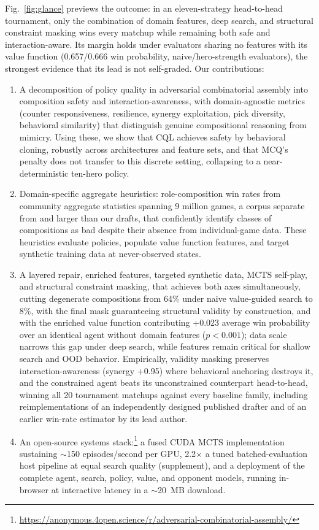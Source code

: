 \documentclass[journal]{IEEEtran}
\newcommand{\repourl}{\url{https://anonymous.4open.science/r/adversarial-combinatorial-assembly/}}
\newcommand{\repourl}{\url{https://github.com/maxsegan/adversarial-combinatorial-assembly}}
\begin{document}
Fig.~\ref{fig:glance} previews the outcome: in an eleven-strategy head-to-head tournament, only the combination of domain features, deep search, and structural constraint masking wins every matchup while remaining both safe and interaction-aware. Its margin holds under evaluators sharing no features with its value function (0.657/0.666 win probability, naive/hero-strength evaluators), the strongest evidence that its lead is not self-graded. Our contributions:
\begin{enumerate}
    \item A decomposition of policy quality in adversarial combinatorial assembly into composition safety and interaction-awareness, with domain-agnostic metrics (counter responsiveness, resilience, synergy exploitation, pick diversity, behavioral similarity) that distinguish genuine compositional reasoning from mimicry. Using these, we show that CQL achieves safety by behavioral cloning, robustly across architectures and feature sets, and that MCQ's penalty does not transfer to this discrete setting, collapsing to a near-deterministic ten-hero policy.
    \item Domain-specific aggregate heuristics: role-composition win rates from community aggregate statistics spanning 9 million games, a corpus separate from and larger than our drafts, that confidently identify classes of compositions as bad despite their absence from individual-game data. These heuristics evaluate policies, populate value function features, and target synthetic training data at never-observed states.
    \item A layered repair, enriched features, targeted synthetic data, MCTS self-play, and structural constraint masking, that achieves both axes simultaneously, cutting degenerate compositions from 64\% under naive value-guided search to 8\%, with the final mask guaranteeing structural validity by construction, and with the enriched value function contributing +0.023 average win probability over an identical agent without domain features ($p < 0.001$); data scale narrows this gap under deep search, while features remain critical for shallow search and OOD behavior. Empirically, validity masking preserves interaction-awareness (synergy +0.95) where behavioral anchoring destroys it, and the constrained agent beats its unconstrained counterpart head-to-head, winning all 20 tournament matchups against every baseline family, including reimplementations of an independently designed published drafter and of an earlier win-rate estimator by its lead author.    \item An open-source systems stack:\footnote{\repourl} a fused CUDA MCTS implementation sustaining $\sim$150 episodes/second per GPU, 2.2$\times$ a tuned batched-evaluation host pipeline at equal search quality (supplement), and a deployment of the complete agent, search, policy, value, and opponent models, running in-browser at interactive latency in a $\sim$20~MB download.
\end{enumerate}
\end{document}
